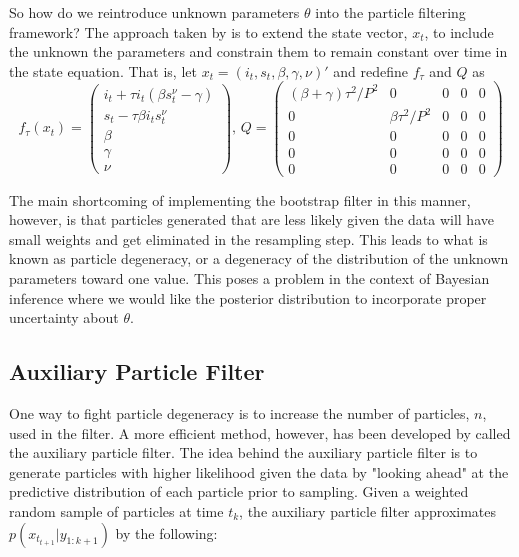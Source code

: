 \documentclass{article}
\begin{document}
So how do we reintroduce unknown parameters $\theta$ into the particle filtering framework?  The approach taken by \citet{skvortsov2012monitoring} is to extend the state vector, $x_t$, to include the unknown the parameters and constrain them to remain constant over time in the state equation.  That is, let $x_t = (i_t,s_t,\beta,\gamma,\nu)'$ and redefine $f_\tau$ and $Q$ as
\[
f_\tau(x_t) = \left(
\begin{array}{c}
i_t + \tau i_t(\beta s^{\nu}_t - \gamma) \\
s_t - \tau\beta i_ts^{\nu}_t \\
\beta \\
\gamma \\
\nu
\end{array}
\right)
\mbox{, }
Q = \left(
\begin{array}{ccccc}
(\beta + \gamma)\tau^2/P^2 & 0 & 0 & 0 & 0 \\
0 & \beta\tau^2/P^2 & 0 & 0 & 0 \\
0 & 0 & 0 & 0 & 0 \\
0 & 0 & 0 & 0 & 0 \\
0 & 0 & 0 & 0 & 0
\end{array}
\right)
 \]

\noindent The main shortcoming of implementing the bootstrap filter in this manner, however, is that particles generated that are less likely given the data will have small weights and get eliminated in the resampling step.  This leads to what is known as particle degeneracy, or a degeneracy of the distribution of the unknown parameters toward one value.  This poses a problem in the context of Bayesian inference where we would like the posterior distribution to incorporate proper uncertainty about $\theta$.

\subsection{Auxiliary Particle Filter}

One way to fight particle degeneracy is to increase the number of particles, $n$, used in the filter.  A more efficient method, however, has been developed by \citet{Pitt:Shep:filt:1999} called the auxiliary particle filter.  The idea behind the auxiliary particle filter is to generate particles with higher likelihood given the data by "looking ahead" at the predictive distribution of each particle prior to sampling.  Given a weighted random sample of particles at time $t_k$, the auxiliary particle filter approximates $p(x_{t_{t+1}}|y_{1:k+1})$ by the following:
\end{document}

